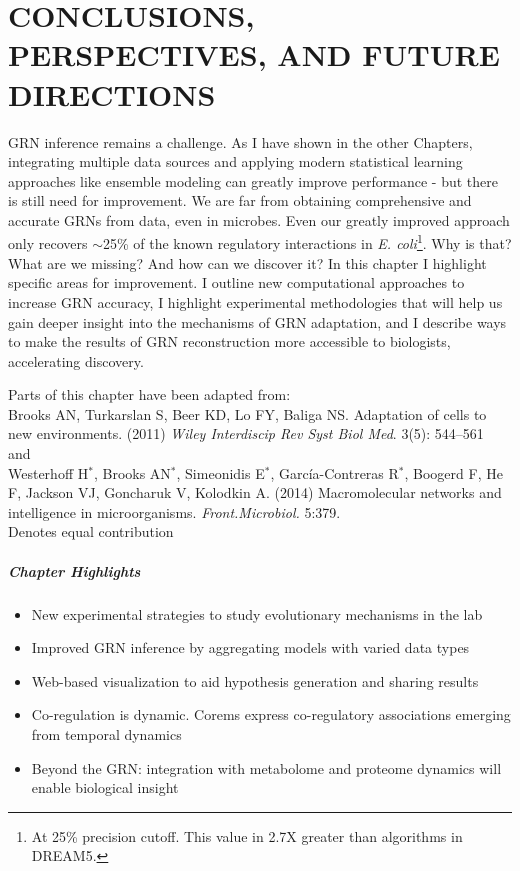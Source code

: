  
\chapter {\uppercase{Conclusions, Perspectives, and Future Directions}}
\label{chap:5}

GRN inference remains a challenge. As I have shown in the other Chapters, integrating multiple data sources and applying modern statistical learning approaches like ensemble modeling can greatly improve performance - but there is still need for improvement. We are far from obtaining comprehensive and accurate GRNs from data, even in microbes. Even our greatly improved approach only recovers $\sim$25\% of the known regulatory interactions in \textit{E. coli}\footnote{At 25\% precision cutoff. This value in 2.7X greater than algorithms in DREAM5.}. Why is that? What are we missing? And how can we discover it? In this chapter I highlight specific areas for improvement. I outline new computational approaches to increase GRN accuracy, I highlight experimental methodologies that will help us gain deeper insight into the mechanisms of GRN adaptation, and I describe ways to make the results of GRN reconstruction more accessible to biologists, accelerating discovery.

\noindent Parts of this chapter have been adapted from: \\

\noindent Brooks AN, Turkarslan S, Beer KD, Lo FY, Baliga NS. Adaptation of cells to new environments. (2011) \emph{Wiley Interdiscip Rev Syst Biol Med}. 3(5): 544–561\\

\noindent and\\

\noindent Westerhoff H$^{*}$, Brooks AN$^{*}$, Simeonidis E$^{*}$, García-Contreras  R$^{*}$, Boogerd F, He  F,   Jackson VJ, Goncharuk V, Kolodkin A. (2014) Macromolecular networks and intelligence in microorganisms. \emph{Front.Microbiol.} 5:379. \\ 

\noindent * Denotes equal contribution

\paragraph{Chapter Highlights}

\begin{itemize}
\item New experimental strategies to study evolutionary mechanisms in the lab 
\item Improved GRN inference by aggregating models with varied data types
\item Web-based visualization to aid hypothesis generation and sharing results
\item Co-regulation is dynamic. Corems express co-regulatory associations emerging from temporal dynamics
\item Beyond the GRN: integration with metabolome and proteome dynamics will enable biological insight
\end{itemize}
 
